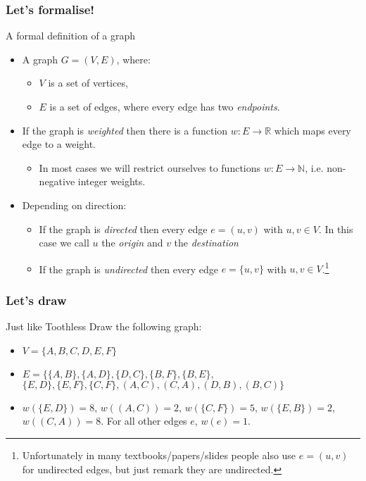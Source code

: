 \begin{frame}
	\frametitle{Let's formalise!}

		\begin{block}{A formal definition of a graph}
			\begin{itemize}
				\item A graph $G=(V,E)$, where:
					\begin{itemize}
						\item $V$ is a set of vertices,
						\item $E$ is a set of edges, where every edge has two \textit{endpoints}.
					\end{itemize}
					\pause
				\item If the graph is \textit{weighted} then there is a function $w: E \to \mathbb{R}$ which maps every edge to
					a weight.
					\pause
					\begin{itemize}
						\item In most cases we will restrict ourselves to functions $w: E \to \mathbb{N}$, i.e. non-negative integer weights.
					\end{itemize}
					\pause
				\item Depending on direction:
					\begin{itemize}
					\pause
						\item If the graph is \textit{directed} then every edge $e = (u,v)$ with $u,v \in V$. In this case we call
							$u$ the \textit{origin} and $v$ the \textit{destination}
					\pause
				\item If the graph is \textit{undirected} then every edge $e = \{u,v\}$ with $u,v \in V$.\footnote{Unfortunately
						in many textbooks/papers/slides people also use $e=(u,v)$ for undirected edges, but just remark they are
					undirected.}
					\end{itemize}
			\end{itemize}
		\end{block}	
\end{frame}

\begin{frame}
	\frametitle{Let's draw}

	\begin{problemblock}{Just like Toothless}
		Draw the following graph:
		\begin{itemize}
			\item $V = \{A,B,C,D,E,F\}$\\
			\item	$E = \{
			\{A, B\},
			\{A, D\},
			\{D, C\},
			\{B, F\},
			\{B, E\},$\\$
			\{E, D\},
			\{E, F\},
			\{C, F\},
			(A,C),
			(C,A),
			(D,B),
			(B,C)
		\}$\\
	\item $w(\{E,D\}) = 8$, $w((A,C)) = 2$, $w(\{C,F\}) = 5$, $w(\{E,B\}) = 2$, $w((C,A)) = 8$.
		For all other edges $e$, $w(e) = 1$.
		\end{itemize}
	\end{problemblock}
\end{frame}

